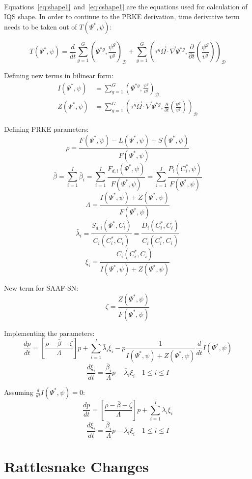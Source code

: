 \documentclass[11pt]{tamurmemo}
\newcommand{\grad}{\vec{\nabla}}
\newcommand{\be}{\begin{equation}}
\newcommand{\ee}{\end{equation}}
\newcommand{\vo}{\vec{\Omega}}
\newcommand{\D}{\ensuremath{\mathcal{D}}}
\begin{document}
Equations~\ref{eq:shape1}~and~\ref{eq:cshape1} are the equations used for calculation of IQS shape.  In order to continue to the PRKE derivation, time derivative term needs to be taken out of $T(\Psi^{*},\psi)$:

\be
T(\Psi^{*},\psi) = \frac{d}{dt}\sum_{g=1}^G\left(\Psi^{*g},\frac{\psi^g}{v^g}\right)_\D + \sum_{g=1}^G\left(\tau^g\vo\cdot\grad\Psi^{*g},\frac{\partial}{\partial t}\left(\frac{\psi^g}{v^g}\right)\right)_\D
\ee

Defining new terms in bilinear form:
\begin{align}
I(\Psi^{*},\psi) &= \sum_{g=1}^G\left(\Psi^{*g},\frac{\psi^g}{v^g}\right)_\D \\
Z(\Psi^{*},\psi) &= \sum_{g=1}^G\left(\tau^g\vo\cdot\grad\Psi^{*g},\frac{\partial}{\partial t}\left(\frac{\psi^g}{v^g}\right)\right)_\D
\end{align}

Defining PRKE parameters:
\be
\rho = \frac{F(\Psi^{*},\psi) - L(\Psi^{*},\psi) + S(\Psi^{*},\psi)}{F(\Psi^{*},\psi)}
\ee
\be
\bar{\beta} = \sum_{i=1}^I\bar{\beta}_i = \sum_{i=1}^I\frac{F_{d,i}(\Psi^*,\psi)}{F(\Psi^{*},\psi)} = \sum_{i=1}^I\frac{P_i(C_i^*,\psi)}{F(\Psi^{*},\psi)}
\ee
\be
\Lambda = \frac{I(\Psi^{*},\psi)+Z(\Psi^{*},\psi)}{F(\Psi^{*},\psi)}
\ee
\be
\bar{\lambda}_i = \frac{S_{d,i}(\Psi^*,C_i)}{C_i(C_i^*,C_i)} = \frac{D_i(C_i^*,C_i)}{C_i(C_i^*,C_i)}
\ee
\be
\xi_i = \frac{C_i(C_i^*,C_i)}{I(\Psi^{*},\psi)+Z(\Psi^{*},\psi)}
\ee

New term for SAAF-SN:
\be 
\zeta = \frac{Z(\Psi^*,\psi)}{F(\Psi^{*},\psi)}
\ee

Implementing the parameters:
\be
\frac{dp}{dt}=\left[\frac{\rho-\bar{\beta}-\zeta}{\Lambda}\right]p + \sum_{i=1}^I\bar{\lambda}_i\xi_i - p\frac{1}{I(\Psi^{*},\psi)+Z(\Psi^{*},\psi)}\frac{d}{dt} I(\Psi^{*},\psi)
\ee
\be
\frac{d\xi_i}{dt}=\frac{\bar{\beta}_i}{\Lambda}p - \bar{\lambda}_i\xi_i \quad 1 \le i \le I 
\ee

Assuming $\frac{d}{dt} I(\Psi^{*},\psi) = 0$:
\be
\frac{dp}{dt}=\left[\frac{\rho-\bar{\beta}-\zeta}{\Lambda}\right]p+\sum_{i=1}^I\bar{\lambda}_i\xi_i
\label{eq:p}
\ee
\be
\frac{d\xi_i}{dt}=\frac{\bar{\beta}_i}{\Lambda}p - \bar{\lambda}_i\xi_i\quad 1 \le i \le I 
\label{eq:xi}
\ee

\section{Rattlesnake Changes}
\end{document}
